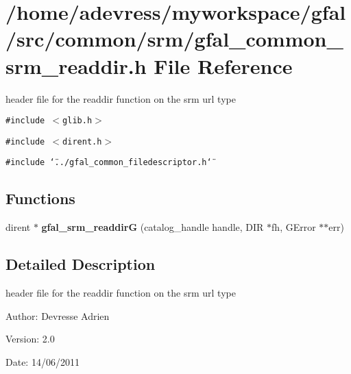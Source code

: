 \section{/home/adevress/myworkspace/gfal/src/common/srm/gfal\_\-common\_\-srm\_\-readdir.h File Reference}
\label{gfal__common__srm__readdir_8h}
header file for the readdir function on the srm url type 

{\tt \#include $<$glib.h$>$}\par
{\tt \#include $<$dirent.h$>$}\par
{\tt \#include \char`\"{}../gfal\_\-common\_\-filedescriptor.h\char`\"{}}\par
\subsection*{Functions}
\begin{CompactItemize}
\item 
dirent $\ast$ \textbf{gfal\_\-srm\_\-readdir\-G} (catalog\_\-handle handle, DIR $\ast$fh, GError $\ast$$\ast$err)\label{gfal__common__srm__readdir_8h_10ca24ea6cbadedb53871ed7b895056f}

\end{CompactItemize}


\subsection{Detailed Description}
header file for the readdir function on the srm url type 

\begin{Desc}
\item[Author:]Devresse Adrien \end{Desc}
\begin{Desc}
\item[Version:]2.0 \end{Desc}
\begin{Desc}
\item[Date:]14/06/2011 \end{Desc}
